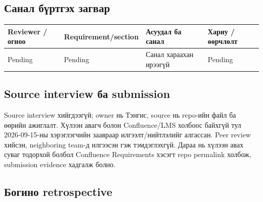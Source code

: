 \subsection{Санал бүртгэх
загвар}\label{doc7-ux441ux430ux43dux430ux43b-ux431ux4afux440ux442ux433ux44dux445-ux437ux430ux433ux432ux430ux440}

\begin{longtable}[]{@{}
  >{\raggedright\arraybackslash}p{}
  >{\raggedright\arraybackslash}p{}
  >{\raggedright\arraybackslash}p{}
  >{\raggedright\arraybackslash}p{}@{}}
\toprule\noalign{}
\begin{minipage}[b]{\linewidth}\raggedright
Reviewer / огноо
\end{minipage} & \begin{minipage}[b]{\linewidth}\raggedright
Requirement/section
\end{minipage} & \begin{minipage}[b]{\linewidth}\raggedright
Асуудал ба санал
\end{minipage} & \begin{minipage}[b]{\linewidth}\raggedright
Хариу / өөрчлөлт
\end{minipage} \\
\midrule\noalign{}
\endhead
\bottomrule\noalign{}
\endlastfoot
Pending & Pending & Санал хараахан ирээгүй & Pending \\
\end{longtable}

\subsection{Source interview ба
submission}\label{doc7-source-interview-ux431ux430-submission}

Source interview хийгдээгүй; owner нь Тэнгис, source нь repo-ийн файл ба
өөрийн ажиглалт. Хүлээн авагч болон Confluence/LMS холбоос байхгүй тул
2026-09-15-ны хэрэглэгчийн заавраар илгээлт/нийтлэлийг алгассан. Peer
review хийсэн, neighboring team-д илгээсэн гэж тэмдэглэхгүй. Дараа нь
хүлээн авах суваг тодорхой болбол Confluence Requirements хэсэгт repo
permalink холбож, submission evidence хадгалж болно.

\subsection{Богино
retrospective}\label{doc7-ux431ux43eux433ux438ux43dux43e-retrospective}

